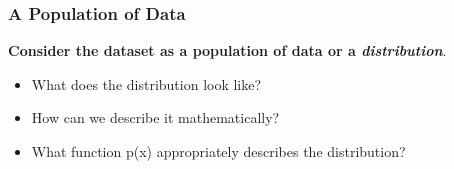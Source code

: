 \documentclass[fleqn]{beamer} %
\newcommand{\sectionIIsubsectionItitle}{A Population of Data}
\begin{document}
			\begin{frame}[label=sectionIIsubsectionI]
				\frametitle{\sectionIIsubsectionItitle}
			 
        \textbf {Consider the dataset as a population of data or a {\it distribution}}.\vspace{2mm}\\  
 
        \begin{itemize}
          \item  What does the distribution look like?
          \item  How can we describe it mathematically? 
          \item  What function p(x) appropriately describes the distribution?  
        \end{itemize}


\end{frame}
\end{document}
